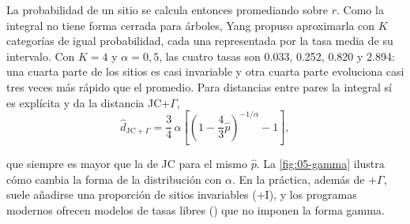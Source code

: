 \noindent La probabilidad de un sitio se calcula entonces promediando sobre $r$. Como la integral no tiene forma cerrada para árboles, Yang propuso aproximarla con $K$ categorías de igual probabilidad, cada una representada por la tasa media de su intervalo. Con $K=4$ y $\alpha=0{,}5$, las cuatro tasas son \num{0.033}, \num{0.252}, \num{0.820} y \num{2.894}: una cuarta parte de los sitios es casi invariable y otra cuarta parte evoluciona casi tres veces más rápido que el promedio. Para distancias entre pares la integral sí es explícita y da la distancia JC+$\Gamma$,
\begin{equation}\label{eq:05-djcg}
\hat d_{\text{JC}+\Gamma} = \frac34\,\alpha\left[\left(1-\frac43\hat p\right)^{-1/\alpha}-1\right],
\end{equation}

\begin{simbolos}
\end{simbolos}

\noindent que siempre es mayor que la de JC para el mismo $\hat p$. La \cref{fig:05-gamma} ilustra cómo cambia la forma de la distribución con $\alpha$. En la práctica, además de $+\Gamma$, suele añadirse una proporción de sitios invariables (+I), y los programas modernos ofrecen modelos de tasas libres () que no imponen la forma gamma.

